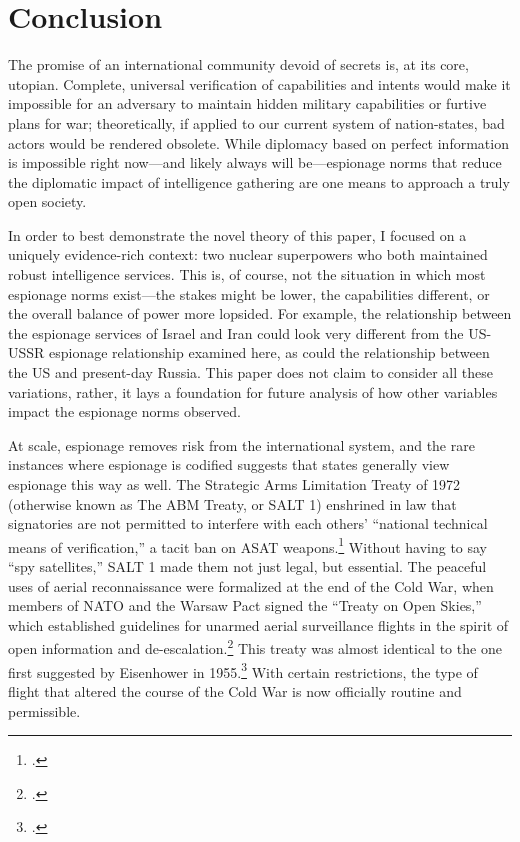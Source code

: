 \documentclass[12pt]{extarticle}
\begin{document}
\section{Conclusion}
The promise of an international community devoid of secrets is, at its core, utopian. Complete, universal verification of capabilities and intents would make it impossible for an adversary to maintain hidden military capabilities or furtive plans for war; theoretically, if applied to our current system of nation-states, bad actors would be rendered obsolete. While diplomacy based on perfect information is impossible right now---and likely always will be---espionage norms that reduce the diplomatic impact of intelligence gathering are one means to approach a truly open society.

In order to best demonstrate the novel theory of this paper, I focused on a uniquely evidence-rich context: two nuclear superpowers who both maintained robust intelligence services. This is, of course, not the situation in which most espionage norms exist---the stakes might be lower, the capabilities different, or the overall balance of power more lopsided. For example, the relationship between the espionage services of Israel and Iran could look very different from the US-USSR espionage relationship examined here, as could the relationship between the US and present-day Russia. This paper does not claim to consider all these variations, rather, it lays a foundation for future analysis of how other variables impact the espionage norms observed.

At scale, espionage removes risk from the international system, and the rare instances where espionage is codified suggests that states generally view espionage this way as well. The Strategic Arms Limitation Treaty of 1972 (otherwise known as The ABM Treaty, or SALT 1) enshrined in law that signatories are not permitted to interfere with each others' ``national technical means of verification,'' a tacit ban on ASAT weapons.\footcite[431]{mcdougall_heavens_1985} Without having to say ``spy satellites,'' SALT 1 made them not just legal, but essential. The peaceful uses of aerial reconnaissance were formalized at the end of the Cold War, when members of NATO and the Warsaw Pact signed the \enquote{Treaty on Open Skies,} which established guidelines for unarmed aerial surveillance flights in the spirit of open information and de-escalation.\footcite{organization_for_security_and_co-operation_in_europe_treaty_1992} This treaty was almost identical to the one first suggested by Eisenhower in 1955.\footcite{center_for_arms_control_and_non-proliferation_fact_2017} With certain restrictions, the type of flight that altered the course of the Cold War is now officially routine and permissible.
\end{document}
